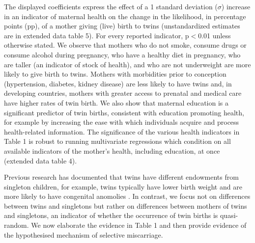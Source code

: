 \documentclass{nature}
\begin{document}
\begin{linenumbers}
The displayed coefficients express the effect of a 1 standard deviation ($\sigma$) increase in an indicator of maternal health on the change in the likelihood, in percentage points (pp), of a mother giving (live) birth to twins (unstandardized estimates are in extended data table 5). For every reported indicator, p$<$0.01 unless otherwise stated. %
We observe that mothers who do not smoke, consume drugs or consume alcohol during pregnancy, who have a healthy diet in pregnancy, who are taller (an indicator of stock of health\cite{Silventoinen2003,BhalotraRawlings2013}), and who are not underweight are more likely to give birth to twins. Mothers with morbidities prior to conception (hypertension, diabetes, kidney disease) are less likely to have twins and, in developing countries, mothers with greater access to prenatal and medical care have higher rates of twin birth. We also show that maternal education is  a significant predictor of twin births, consistent with education promoting health, for example by increasing the ease with which individuals acquire and process health-related information\cite{Kenkel1991,CutlerLlerasMuney2010}.%
The significance of the various health indicators in Table 1 is robust to running multivariate regressions which condition on all available indicators of the mother's health, including education, at once (extended data table 4). 

Previous research has documented that twins have different endowments from singleton children, for example, twins typically have lower birth weight and are more likely to have congenital anomolies \cite{Hall2003}. In contrast, we focus not on differences between twins and singletons but rather on differences between mothers of twins and singletons, an indicator of whether the occurrence of twin births is quasi-random. We now elaborate the evidence in Table 1 and then provide evidence of the hypothesised mechanism of selective miscarriage.



\end{linenumbers}
\end{document}

